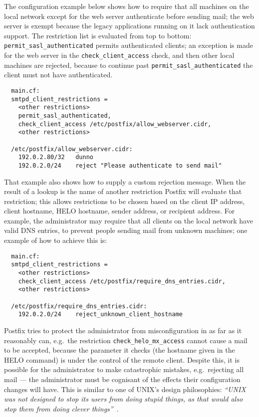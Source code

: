 The configuration example below shows how to require that all machines on
the local network except for the web server authenticate before sending
mail; the web server is exempt because the legacy applications running on
it lack authentication support.  The restriction list is evaluated from top
to bottom: \texttt{permit\_sasl\_authenticated} permits authenticated
clients; an exception is made for the web server in the
\texttt{check\_client\_access} check, and then other local machines are
rejected, because to continue past \texttt{permit\_sasl\_authenticated} the
client must not have authenticated.

\begin{verbatim}
  main.cf:
  smtpd_client_restrictions =
    <other restrictions>
    permit_sasl_authenticated,
    check_client_access /etc/postfix/allow_webserver.cidr,
    <other restrictions>

  /etc/postfix/allow_webserver.cidr:
    192.0.2.80/32   dunno
    192.0.2.0/24    reject "Please authenticate to send mail"
\end{verbatim}

That example also shows how to supply a custom rejection message.  When the
result of a lookup is the name of another restriction Postfix will evaluate
that restriction; this allows restrictions to be chosen based on the client
IP address, client hostname, HELO hostname, sender address, or recipient
address.  For example, the administrator may require that all clients on
the local network have valid DNS entries, to prevent people sending mail
from unknown machines; one example of how to achieve this is:

\begin{verbatim}
  main.cf:
  smtpd_client_restrictions =
    <other restrictions>
    check_client_access /etc/postfix/require_dns_entries.cidr,
    <other restrictions>

  /etc/postfix/require_dns_entries.cidr:
    192.0.2.0/24    reject_unknown_client_hostname
\end{verbatim}

Postfix tries to protect the administrator from misconfiguration in as far
as it reasonably can, e.g.\ the restriction
\texttt{check\_helo\_mx\_access} cannot cause a mail to be accepted,
because the parameter it checks (the hostname given in the HELO command) is
under the control of the remote client.  Despite this, it is possible for
the administrator to make catastrophic mistakes, e.g.\ rejecting all mail
--- the administrator must be cognisant of the effects their configuration
changes will have.  This is similar to one of UNIX's design philosophies:
\textit{``UNIX was not designed to stop its users from doing stupid things,
as that would also stop them from doing clever
things''\/}~\cite{unix-philosophy}.

